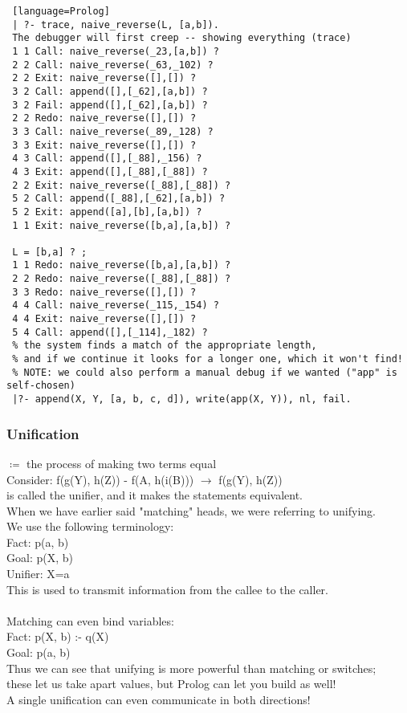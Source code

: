\documentclass[../../lecture_notes.tex]{subfiles}
\begin{document}
\begin{lstlisting} [language=Prolog]
 | ?- trace, naive_reverse(L, [a,b]).
 The debugger will first creep -- showing everything (trace)
 1 1 Call: naive_reverse(_23,[a,b]) ?
 2 2 Call: naive_reverse(_63,_102) ?
 2 2 Exit: naive_reverse([],[]) ?
 3 2 Call: append([],[_62],[a,b]) ?
 3 2 Fail: append([],[_62],[a,b]) ?
 2 2 Redo: naive_reverse([],[]) ?
 3 3 Call: naive_reverse(_89,_128) ?
 3 3 Exit: naive_reverse([],[]) ?
 4 3 Call: append([],[_88],_156) ?
 4 3 Exit: append([],[_88],[_88]) ?
 2 2 Exit: naive_reverse([_88],[_88]) ?
 5 2 Call: append([_88],[_62],[a,b]) ?
 5 2 Exit: append([a],[b],[a,b]) ?
 1 1 Exit: naive_reverse([b,a],[a,b]) ?
 
 L = [b,a] ? ;
 1 1 Redo: naive_reverse([b,a],[a,b]) ?
 2 2 Redo: naive_reverse([_88],[_88]) ?
 3 3 Redo: naive_reverse([],[]) ?
 4 4 Call: naive_reverse(_115,_154) ?
 4 4 Exit: naive_reverse([],[]) ?
 5 4 Call: append([],[_114],_182) ?
 % the system finds a match of the appropriate length, 
 % and if we continue it looks for a longer one, which it won't find!
 % NOTE: we could also perform a manual debug if we wanted ("app" is self-chosen)
 |?- append(X, Y, [a, b, c, d]), write(app(X, Y)), nl, fail.
\end{lstlisting}

\subsubsection*{Unification}
$\coloneqq$ the process of making two terms equal\\
Consider: f(g(Y), h(Z)) - f(A, h(i(B))) $\rightarrow$ f(g(Y), h(Z))\\
	 is called the unifier, and it makes the statements equivalent.\\
When we have earlier said "matching" heads, we were referring to unifying.\\
We use the following terminology:\\
	\indent Fact: p(a, b)\\
	\indent Goal: p(X, b)\\
	\indent Unifier: {X=a}\\
This is used to transmit information from the callee to the caller.\\
\\
Matching can even bind variables:\\
	\indent Fact: p(X, b) :- q(X)\\
	\indent Goal: p(a, b)\\
Thus we can see that unifying is more powerful than matching or switches;\\
	\indent these let us take apart values, but Prolog can let you build as well!
\\
A single unification can even communicate in both directions!\\
\end{document}
